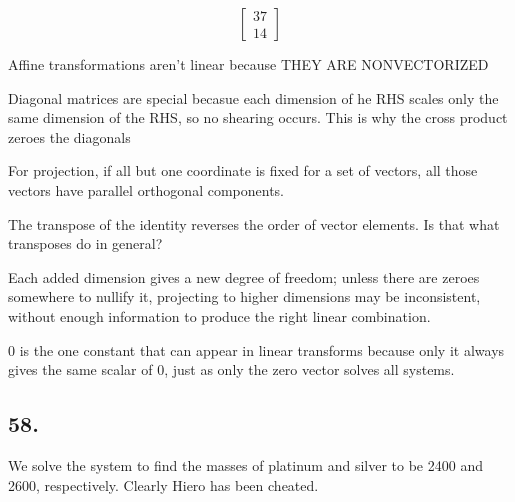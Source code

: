 \documentclass[]{article}
\newenvironment{Shaded}{\begin{snugshade}}{\end{snugshade}}
\newcommand{\DataTypeTok}[1]{\textcolor[rgb]{0.00,0.34,0.68}{#1}}
\newcommand{\DecValTok}[1]{\textcolor[rgb]{0.69,0.50,0.00}{#1}}
\newcommand{\FloatTok}[1]{\textcolor[rgb]{0.69,0.50,0.00}{#1}}
\newcommand{\KeywordTok}[1]{\textcolor[rgb]{0.12,0.11,0.11}{\textbf{#1}}}
\newcommand{\NormalTok}[1]{\textcolor[rgb]{0.12,0.11,0.11}{#1}}
\newcommand{\OperatorTok}[1]{\textcolor[rgb]{0.12,0.11,0.11}{#1}}
\newcommand{\StringTok}[1]{\textcolor[rgb]{0.75,0.01,0.01}{#1}}
\begin{document}
\begin{Shaded}
\end{Shaded}

\[
\begin{bmatrix}
37\\
14
\end{bmatrix}
\]

Affine transformations aren't linear because THEY ARE NONVECTORIZED

Diagonal matrices are special becasue each dimension of he RHS scales
only the same dimension of the RHS, so no shearing occurs. This is why
the cross product zeroes the diagonals

For projection, if all but one coordinate is fixed for a set of vectors,
all those vectors have parallel orthogonal components.

The transpose of the identity reverses the order of vector elements. Is
that what transposes do in general?

Each added dimension gives a new degree of freedom; unless there are
zeroes somewhere to nullify it, projecting to higher dimensions may be
inconsistent, without enough information to produce the right linear
combination.

0 is the one constant that can appear in linear transforms because only
it always gives the same scalar of 0, just as only the zero vector
solves all systems.

\hypertarget{section-12}{%
\subsection{58.}\label{section-12}}

We solve the system to find the masses of platinum and silver to be 2400
and 2600, respectively. Clearly Hiero has been cheated.

\begin{Shaded}
\end{Shaded}
\end{document}
